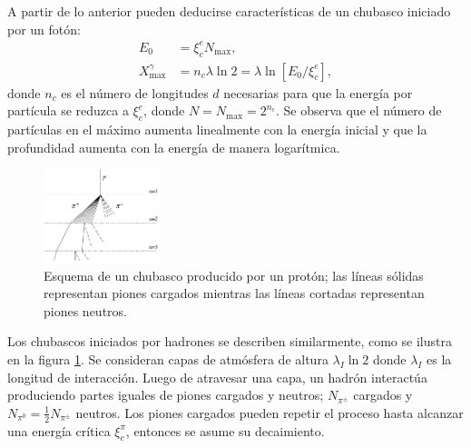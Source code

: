 		A partir de lo anterior pueden deducirse características de un chubasco iniciado por un fotón:
		\begin{align}
		E_0 &= \xi ^e_c N_{\text{max}} \label{e0_em}, \\
		X^{\gamma}_{\text{max}} &= n_c \lambda \ln 2 = \lambda \ln[E_0/\xi ^e_c] \label{xmax_em},
		\end{align}
		donde $n_c$ es el número de longitudes $d$ necesarias para que la energía por partícula se reduzca a $\xi_c^e$, donde $N = N_{\text{max}}= 2^{n_c}$. Se observa que el número de partículas en el máximo aumenta linealmente con la energía inicial y que la profundidad aumenta con la energía de manera logarítmica.
		\begin{figure}
		\includegraphics[width=0.3\textwidth]{Figuras/heitler_h.png} 
		\caption{Esquema de un chubasco producido por un protón; las líneas sólidas representan piones cargados mientras las líneas cortadas representan piones neutros.}
		\label{fig:heitler_h}
		\end{figure}	 
		Los chubascos iniciados por hadrones se describen similarmente, como se ilustra en la figura \ref{fig:heitler_h}. Se consideran capas de atmósfera de altura $\lambda_I \ln 2$ donde $\lambda_I$ es la longitud de interacción. Luego de atravesar una capa, un hadrón interactúa produciendo partes iguales de piones cargados y neutros; $N_{\pi^{\pm}}$ cargados y $N_{\pi^{0}}=\frac{1}{2}N_{\pi^{\pm}}$ neutros. Los piones cargados pueden repetir el proceso hasta alcanzar una energía crítica $\xi_c^{\pi}$, entonces se asume su decaimiento. \\
		
